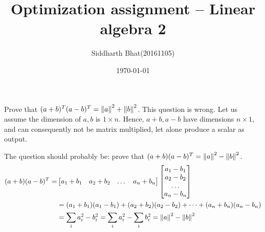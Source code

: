 \documentclass[11pt]{article}
\author{Siddharth Bhat(20161105)}
\title{Optimization assignment -- Linear algebra 2}
\date{\today}
\begin{document}
\maketitle
\thispagestyle{fancy}
Prove that $(a+b)^T(a-b)^T = \norm{a}^2 + \norm{b}^2$. This question is
wrong. Let us assume the dimension of $a, b$ is $1 \times n$. Hence, $a +b, a- b$
have dimensions $n \times 1$, and can consequently not be matrix multiplied,
let alone produce a scalar as output.

The question should probably be: prove that $(a+b)(a-b)^T = \norm{a}^2 - \norm{b}^2$.
\begin{align*}
    (a+b)(a-b)^T = &
    \begin{bmatrix} a_1 + b_1 & a_2 + b_2 & \dots & a_n + b_n \end{bmatrix}
    \begin{bmatrix} a_1 - b_1 \\ a_2 - b_2 \\ \dots \\ a_n - b_n \end{bmatrix}   \\
    &= (a_1 + b_1) (a_1 - b_1) +(a_2 + b_2) (a_2 - b_2) + \dots + (a_n + b_n) (a_n - b_n) \\
    &= \sum_i a_i^2 - b_i^2 = \sum_i a_i^2 - \sum_i b_i^2 = \norm{a}^2 - \norm{b}^2
\end{align*}
\end{document}
